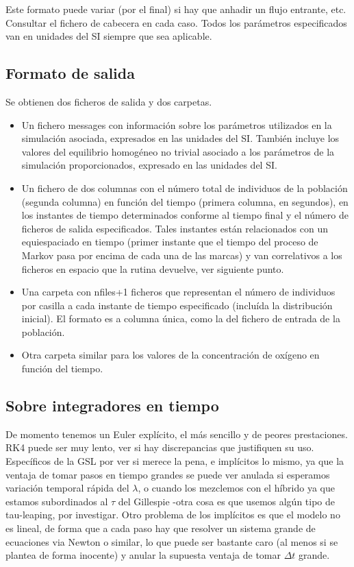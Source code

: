 \documentclass[12pt]{article}
\numberwithin{equation}{section}
\begin{document}
Este formato puede variar (por el final) si hay que anhadir un flujo entrante, etc. Consultar el fichero de cabecera en cada caso. Todos los par\'ametros especificados van en unidades del SI siempre que  sea aplicable.

\subsection{Formato de salida}
\label{subsec:salida}
Se obtienen dos ficheros de salida y dos carpetas. 
\begin{itemize}
\item Un fichero messages con informaci\'on sobre los par\'ametros utilizados en la simulaci\'on asociada, expresados en las unidades del SI. Tambi\'en incluye los valores del equili\-brio homog\'eneo no trivial asociado a los par\'ametros de la simulaci\'on proporcionados, expresado en las unidades del SI.

\item Un fichero de dos columnas con el n\'umero total de individuos  de la poblaci\'on (segunda columna)
 en funci\'on del tiempo (primera columna, en segundos), en los instantes de tiempo determinados conforme al tiempo final y el n\'umero de ficheros de salida especificados. Tales instantes est\'an relacionados con un equiespaciado en tiempo (primer instante que el tiempo del proceso de Markov pasa por encima de cada una de las marcas) y van correlativos a los ficheros en espacio que la rutina devuelve, ver siguiente punto. 

\item Una carpeta con nfiles+1 ficheros que representan el n\'umero de individuos por casilla 
 a cada instante de tiempo especificado (inclu\'ida la distribuci\'on inicial). El formato es a columna \'unica, como la del fichero de entrada de la poblaci\'on.

\item Otra carpeta similar para los valores de la concentraci\'on de  ox\'igeno en funci\'on del tiempo.
\end{itemize}


\subsection{Sobre integradores en tiempo}
De momento tenemos un Euler expl\'icito, el m\'as sencillo y de peores prestaciones. RK4 puede ser muy lento, ver si hay discrepancias que justifiquen su uso. Espec\'ificos de la GSL por ver si merece la pena, e impl\'icitos lo mismo, ya que la ventaja de tomar pasos en tiempo grandes se puede ver anulada si esperamos variaci\'on temporal r\'apida del $\lambda$, o cuando los mezclemos con el h\'ibrido ya que estamos subordinados al $\tau$ del Gillespie -otra cosa es que usemos alg\'un tipo de tau-leaping, por investigar. Otro problema de los impl\'icitos es que el modelo no es lineal, de forma que a cada paso hay que resolver un sistema grande de ecuaciones via Newton o similar, lo que puede ser bastante caro (al menos si se plantea de forma inocente) y anular la supuesta ventaja de tomar $\Delta t$ grande.
\end{document}
